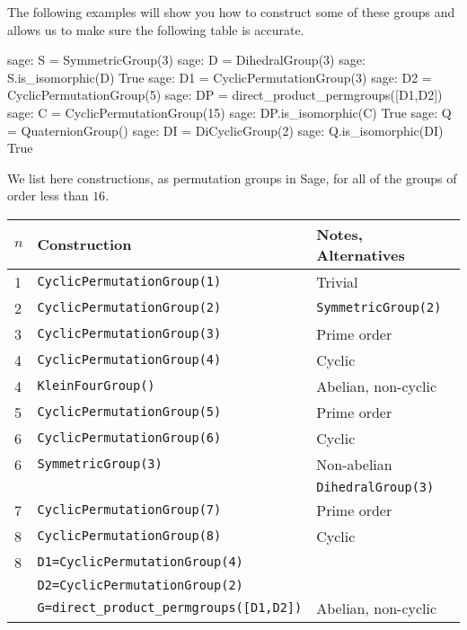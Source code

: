 %
The following examples will show you how to construct some of these groups and allows us to make sure the following table is accurate.
%
\begin{sageexample}
sage: S = SymmetricGroup(3)
sage: D = DihedralGroup(3)
sage: S.is_isomorphic(D)
True
sage: D1 = CyclicPermutationGroup(3)
sage: D2 = CyclicPermutationGroup(5)
sage: DP = direct_product_permgroups([D1,D2])
sage: C  = CyclicPermutationGroup(15)
sage: DP.is_isomorphic(C)
True
sage: Q  = QuaternionGroup()
sage: DI = DiCyclicGroup(2)
sage: Q.is_isomorphic(DI)
True
\end{sageexample}
%
%
We list here constructions, as permutation groups in Sage, for all of the groups of order less than $16$.\\
%
{\fontsize{10pt}{12pt}\selectfont
\begin{tabular}{l|l|l}
$n$ &    Construction                              & Notes, Alternatives\\\hline\hline
1 & \verb!CyclicPermutationGroup(1)!               & Trivial \\\hline\hline
2 & \verb!CyclicPermutationGroup(2)!               & \verb!SymmetricGroup(2)!\\\hline\hline
3 & \verb!CyclicPermutationGroup(3)!               & Prime order \\\hline\hline
4 & \verb!CyclicPermutationGroup(4)!               & Cyclic \\\hline
4 & \verb!KleinFourGroup()!                        & Abelian, non-cyclic\\\hline\hline
5 & \verb!CyclicPermutationGroup(5)!               & Prime order \\\hline\hline
6 & \verb!CyclicPermutationGroup(6)!               & Cyclic \\\hline
6 & \verb!SymmetricGroup(3)!                       & Non-abelian\\
  &                                                & \verb!DihedralGroup(3)!\\\hline\hline
7 & \verb!CyclicPermutationGroup(7)!               & Prime order \\\hline\hline
8 & \verb!CyclicPermutationGroup(8)!               & Cyclic \\\hline
8 & \verb!D1=CyclicPermutationGroup(4)!            & \\
  & \verb!D2=CyclicPermutationGroup(2)!            & \\
  & \verb!G=direct_product_permgroups([D1,D2])!    & Abelian, non-cyclic\\\hline

\end{tabular}}
